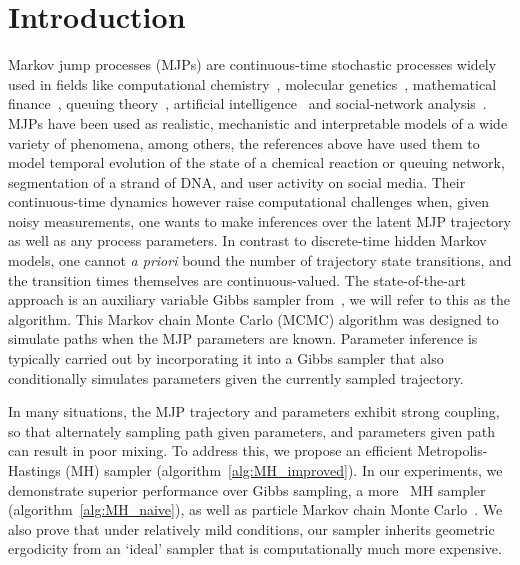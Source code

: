 
\section{Introduction}
\label{sec:intro}
Markov jump processes (MJPs) are continuous-time stochastic processes widely used in fields like computational chemistry~\citep{gillespie97}, molecular genetics~\citep{FearnSher2006}, mathematical finance~\citep{Elliott06}, queuing theory~\citep{Breuer2003}, artificial intelligence~\citep{XuShe10} and social-network analysis~\citep{pan2016markov}. 
MJPs have been used as realistic, mechanistic and interpretable models of a wide variety of phenomena, among others, the references above have used them to model temporal evolution of the state of a chemical reaction or queuing network, segmentation of a strand of DNA, and user activity on social media.
Their continuous-time dynamics however raise computational challenges when, given noisy measurements, one wants to make inferences 
over the latent MJP trajectory as well as any process parameters. 
In contrast to {discrete-time} hidden Markov models, one cannot 
{\em a priori} bound the number of trajectory state transitions, and the transition times themselves are continuous-valued. 
The state-of-the-art approach is an auxiliary variable Gibbs sampler from~\cite{RaoTeh13}, we will refer to this as the {\algname} algorithm. 
This Markov chain Monte Carlo (MCMC) algorithm was designed to simulate paths when the MJP parameters are known. 
Parameter inference is typically carried out by incorporating it into a Gibbs sampler that also conditionally simulates parameters given the currently sampled trajectory. 

In many situations, the MJP trajectory and parameters exhibit strong coupling, so that alternately sampling path given parameters, and parameters given path can result in poor mixing.  
To address this, we propose an efficient Metropolis-Hastings (MH) sampler (algorithm~\ref{alg:MH_improved}). 
In our experiments, we demonstrate superior performance over Gibbs sampling, a more \naive\ MH sampler (algorithm~\ref{alg:MH_naive}), as well as particle Markov chain Monte Carlo~\citep{Andrieu10}. 
We also prove that under relatively mild conditions, our sampler inherits geometric ergodicity from an `ideal' sampler that is computationally much more expensive.

